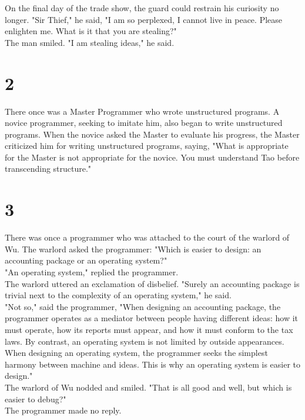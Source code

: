 \documentclass[14pt, letterpaper]{book}
\begin{document}
On the final day of the trade show, the guard could restrain his curiosity no longer. "Sir Thief," he said, "I am so perplexed, I cannot live in peace. Please enlighten me. What is it that you are stealing?"\\

The man smiled. "I am stealing ideas," he said.\\

\section*{2}
There once was a Master Programmer who wrote unstructured programs. A novice programmer, seeking to imitate him, also began to write unstructured programs. When the novice asked the Master to evaluate his progress, the Master criticized him for writing unstructured programs, saying, "What is appropriate for the Master is not appropriate for the novice. You must understand Tao before transcending structure."

\section*{3}
There was once a programmer who was attached to the court of the warlord of Wu. The warlord asked the programmer: "Which is easier to design: an accounting package or an operating system?"\\

"An operating system," replied the programmer.\\

The warlord uttered an exclamation of disbelief. "Surely an accounting package is trivial next to the complexity of an operating system," he said.\\

"Not so," said the programmer, "When designing an accounting package, the programmer operates as a mediator between people having different ideas: how it must operate, how its reports must appear, and how it must conform to the tax laws. By contrast, an operating system is not limited by outside appearances. When designing an operating system, the programmer seeks the simplest harmony between machine and ideas. This is why an operating system is easier to design."\\

The warlord of Wu nodded and smiled. "That is all good and well, but which is easier to debug?"\\

The programmer made no reply.
\end{document}
